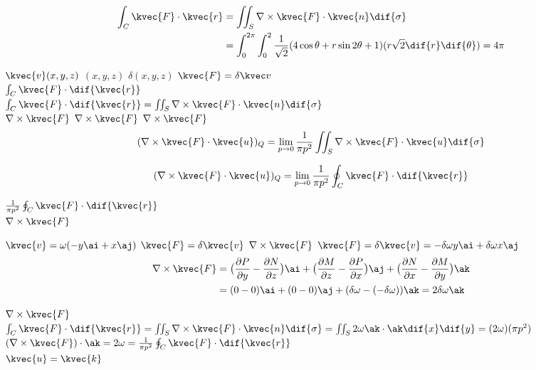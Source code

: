 
\begin{align*}
\int_{C}\kvec{F}\cdot\kvec{r}&=\iint_{S}\nabla\times\kvec{F}\cdot\kvec{n}\dif{\sigma}\\
&=\int_{0}^{2\pi}\int_{0}^{2}\frac{1}{\sqrt{2}}(4\cos \theta+r\sin 2\theta+1)(r\sqrt{2}\dif{r}\dif{\theta})=4\pi
\end{align*}


\(\kvec{v}(x,y,z)\)
\((x,y,z)\)
\(\delta(x,y,z)\)
\(\kvec{F}=\delta\kvec v\)\\

\(\int_{C}\kvec{F}\cdot\dif{\kvec{r}}\)\\
\(\int_{C}\kvec{F}\cdot\dif{\kvec{r}}=\iint_{S}\nabla\times\kvec{F}\cdot\kvec{n}\dif{\sigma}\)\\
\(\nabla\times\kvec{F}\)
\(\nabla\times\kvec{F}\)
\(\nabla\times\kvec{F}\)\\

\begin{align}
(\nabla\times\kvec{F}\cdot\kvec{u})_Q=\lim_{p\to{0}}\frac{1}{\pi p^{2}}\iint_{S}\nabla\times\kvec{F}\cdot\kvec{u}\dif{\sigma}
\end{align}

\begin{align}
(\nabla\times\kvec{F}\cdot\kvec{u})_Q=\lim_{p\to{0}}\frac{1}{\pi p^{2}}\oint_{C}\kvec{F}\cdot\dif{\kvec{r}}
\end{align}

\(\frac{1}{\pi p^{2}}\oint_{C}\kvec{F}\cdot\dif{\kvec{r}}\)\\
\(\nabla\times\kvec{F}\)


\(\kvec{v}=\omega(-y\ai+x\aj)\)
\(\kvec{F}=\delta\kvec{v}\)
\(\nabla\times\kvec{F}\)
\(\kvec{F}=\delta\kvec{v}=-\delta\omega y\ai+\delta\omega x\aj\)\\

\begin{align*}
\nabla\times\kvec{F}&=\big(\frac{\partial P}{\partial y}-\frac{\partial N}{\partial z}\big)\ai+\big(\frac{\partial M}{\partial z}-\frac{\partial P}{\partial x}\big)\aj+\big(\frac{\partial N}{\partial x}-\frac{\partial M}{\partial y}\big)\ak\\
&=(0-0)\ai+(0-0)\aj+(\delta\omega-(-\delta\omega))\ak=2\delta\omega\ak
\end{align*}


\(\nabla\times\kvec{F}\)\\
\(\int_{C}\kvec{F}\cdot\dif{\kvec{r}}=\iint_{S}\nabla\times\kvec{F}\cdot\kvec{n}\dif{\sigma}=\iint_{S}2\omega \ak\cdot\ak\dif{x}\dif{y}=(2\omega)(\pi p^{2})\)\\
\((\nabla\times\kvec{F})\cdot\ak=2\omega=\frac{1}{\pi p^{2}}\oint_{C}\kvec{F}\cdot\dif{\kvec{r}}\)\\
\(\kvec{u}=\kvec{k}\)\\

